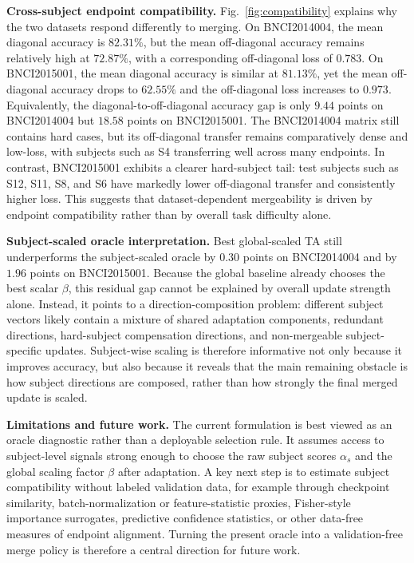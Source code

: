 \documentclass[conference]{IEEEtran}
\begin{document}
\textbf{Cross-subject endpoint compatibility.} Fig.~\ref{fig:compatibility} explains why the two datasets respond differently to merging. On BNCI2014004, the mean diagonal accuracy is $82.31\%$, but the mean off-diagonal accuracy remains relatively high at $72.87\%$, with a corresponding off-diagonal loss of $0.783$. On BNCI2015001, the mean diagonal accuracy is similar at $81.13\%$, yet the mean off-diagonal accuracy drops to $62.55\%$ and the off-diagonal loss increases to $0.973$. Equivalently, the diagonal-to-off-diagonal accuracy gap is only $9.44$ points on BNCI2014004 but $18.58$ points on BNCI2015001. The BNCI2014004 matrix still contains hard cases, but its off-diagonal transfer remains comparatively dense and low-loss, with subjects such as S4 transferring well across many endpoints. In contrast, BNCI2015001 exhibits a clearer hard-subject tail: test subjects such as S12, S11, S8, and S6 have markedly lower off-diagonal transfer and consistently higher loss. This suggests that dataset-dependent mergeability is driven by endpoint compatibility rather than by overall task difficulty alone.

\textbf{Subject-scaled oracle interpretation.} Best global-scaled TA still underperforms the subject-scaled oracle by $0.30$ points on BNCI2014004 and by $1.96$ points on BNCI2015001. Because the global baseline already chooses the best scalar $\beta$, this residual gap cannot be explained by overall update strength alone. Instead, it points to a direction-composition problem: different subject vectors likely contain a mixture of shared adaptation components, redundant directions, hard-subject compensation directions, and non-mergeable subject-specific updates. Subject-wise scaling is therefore informative not only because it improves accuracy, but also because it reveals that the main remaining obstacle is how subject directions are composed, rather than how strongly the final merged update is scaled.

\textbf{Limitations and future work.} The current formulation is best viewed as an oracle diagnostic rather than a deployable selection rule. It assumes access to subject-level signals strong enough to choose the raw subject scores $\alpha_s$ and the global scaling factor $\beta$ after adaptation. A key next step is to estimate subject compatibility without labeled validation data, for example through checkpoint similarity, batch-normalization or feature-statistic proxies, Fisher-style importance surrogates, predictive confidence statistics, or other data-free measures of endpoint alignment. Turning the present oracle into a validation-free merge policy is therefore a central direction for future work.
\end{document}
